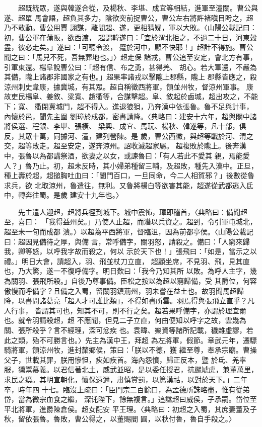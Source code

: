 \documentclass[11pt]{article}
\begin{document}
\begin{itemize}
　　超既統眾，遂與韓遂合從，及楊秋、李堪、成宜等相結，進軍至潼關。曹公與遂、超單
馬會語，超負其多力，陰欲突前捉曹公，曹公左右將許褚瞋目盻之，超乃不敢動。曹公用賈
詡謀，離間超、遂，更相猜疑，軍以大敗。〈山陽公載記曰：初，曹公軍在蒲阪，欲西渡，
超謂韓遂曰：「宜於渭北拒之，不過二十日，河東穀盡，彼必走矣。」遂曰：「可聽令渡，
蹙於河中，顧不快耶！」超計不得施。曹公聞之曰：「馬兒不死，吾無葬地也。」〉超走保
諸戎，曹公追至安定，會北方有事，引軍東還。楊阜說曹公曰：「超有信、布之勇，甚得羌、
胡心。若大軍還，不嚴為其備，隴上諸郡非國家之有也。」超果率諸戎以擊隴上郡縣，隴上
郡縣皆應之，殺涼州刺史韋康，據冀城，有其眾。超自稱徵西將軍，領並州牧，督涼州軍事。
康故吏民楊阜、姜敘、梁寬、趙衢等，合謀擊超。阜、敘起於鹵城，超出攻之，不能下；寬、
衢閉冀城門，超不得入。進退狼狽，乃奔漢中依張魯。魯不足與計事，內懷於邑，聞先主圍
劉璋於成都，密書請降。〈典略曰：建安十六年，超與關中諸將侯選、程銀、李堪、張橫、
梁興、成宜、馬玩、楊秋、韓遂等，凡十部，俱反，其眾十萬，同據河、潼，建列營陳。是
歲，曹公西徵，與超等戰於河、渭之交，超等敗走。超至安定，遂奔涼州。詔收滅超家屬。
超複敗於隴上。後奔漢中，張魯以為都講祭酒，欲妻之以女，或諫魯曰：「有人若此不愛其
親，焉能愛人？」魯乃止。初，超未反時，其小婦弟種留三輔，及超敗，種先入漢中。正旦，
種上壽於超，超搥胸吐血曰：「闔門百口，一旦同命，今二人相賀邪？」後數從魯求兵，欲
北取涼州，魯遣往，無利。又魯將楊白等欲害其能，超遂從武都逃入氐中，轉奔往蜀。是歲
建安十九年也。〉

　　先主遣人迎超，超將兵徑到城下。城中震怖，璋即稽首，〈典略曰：備聞超至，喜曰：
「我得益州矣。」乃使人止超，而潛以兵資之。超到，令引軍屯城北，超至未一旬而成都
潰。〉以超為平西將軍，督臨沮，因為前都亭侯。〈山陽公載記曰：超因見備待之厚，與備
言，常呼備字，關羽怒，請殺之。備曰：「人窮來歸我，卿等怒，以呼我字故而殺之，何以
示於天下也！」張飛曰：「如是，當示之以禮。」明日大會，請超入，羽、飛並杖刀立直，
超顧坐席，不見羽、飛，見其直也，乃大驚，遂一不復呼備字。明日歎曰：「我今乃知其所
以敗。為呼人主字，幾為關羽、張飛所殺。」自後乃尊事備。臣松之按以為超以窮歸備，受
其爵位，何容傲慢而呼備字？且備之入蜀，留關羽鎮荊州，羽未嘗在益土也。故羽聞馬超歸
降，以書問諸葛亮「超人才可誰比類」，不得如書所雲。羽焉得與張飛立直乎？凡人行事，
皆謂其可也，知其不可，則不行之矣。超若果呼備字，亦謂於理宜爾也。就令羽請殺超，超
不應聞，但見二子立直，何由便知以呼字之故，雲幾為關、張所殺乎？言不經理，深可忿疾
也。袁暐、樂資等諸所記載，穢雜虛謬，若此之類，殆不可勝言也。〉先主為漢中王，拜超
為左將軍，假節。章武元年，遷驃騎將軍，領涼州牧，進封斄鄉侯，策曰：「朕以不德，獲
繼至尊，奉承宗廟。曹操父子，世載其罪，朕用慘怛，疢如疾首。海內怨憤，歸正反本，暨
於氐、羌率服，獯鬻慕義。以君信著北土，威武並昭，是以委任授君，抗颺虓虎，兼董萬里，
求民之瘼。其明宣朝化，懷保遠邇，肅慎賞罰，以篤漢祜，以對於天下。」二年卒，時年四
十七。臨沒上疏曰：「臣門宗二百餘口，為孟德所誅略盡，惟有從弟岱，當為微宗血食之繼，
深讬陛下，餘無複言。」追諡超曰威侯，子承嗣。岱位至平北將軍，進爵陳倉侯。超女配安
平王理。〈典略曰：初超之入蜀，其庶妻董及子秋，留依張魯。魯敗，曹公得之，以董賜閻
圃，以秋付魯，魯自手殺之。〉


\end{itemize}
\end{document}
